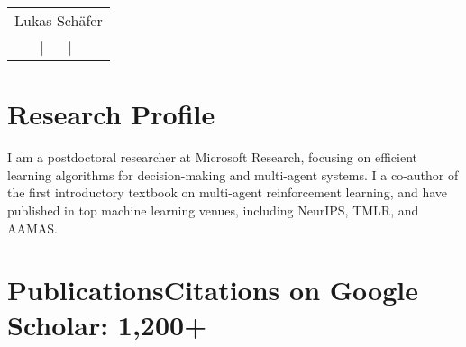 \documentclass[a4paper,12pt]{article}
\begin{document}
\nocite{*}

\pagestyle{empty} 



\begin{tabularx}{\linewidth}{@{} C @{}}
\Huge{Lukas Sch\"afer} \\[7.5pt]
 \ $|$ \
 \ $|$ \
 \\
\end{tabularx}

\section{Research Profile}
I am a postdoctoral researcher at Microsoft Research, focusing on efficient learning algorithms for decision-making and multi-agent systems. I a co-author of the first introductory textbook on multi-agent reinforcement learning, and have published in top machine learning venues, including NeurIPS, TMLR, and AAMAS. %

\section{Publications\hfill {\large Citations on Google Scholar: 1,200+}}
\end{document}
